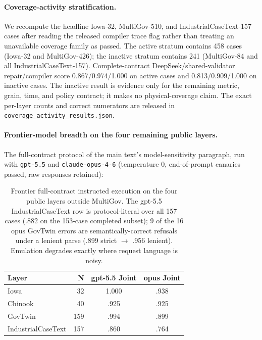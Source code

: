 \documentclass[letterpaper]{article}
\begin{document}
\paragraph{Coverage-activity stratification.}
We recompute the headline Iowa-32, MultiGov-510, and IndustrialCaseText-157 cases after reading the released compiler trace flag rather than treating an unavailable coverage family as passed. The active stratum contains 458 cases (Iowa-32 and MultiGov-426); the inactive stratum contains 241 (MultiGov-84 and all IndustrialCaseText-157). Complete-contract DeepSeek/shared-validator repair/compiler score 0.867/0.974/1.000 on active cases and 0.813/0.909/1.000 on inactive cases. The inactive result is evidence only for the remaining metric, grain, time, and policy contract; it makes no physical-coverage claim. The exact per-layer counts and correct numerators are released in \texttt{coverage\_activity\_results.json}.

\paragraph{Frontier-model breadth on the four remaining public layers.}
The full-contract protocol of the main text's model-sensitivity paragraph, run with \texttt{gpt-5.5} and \texttt{claude-opus-4-6} (temperature 0, end-of-prompt canaries passed, raw responses retained):

\begin{table}[t]
\centering
\scriptsize
\begin{tabular}{lrcc}
\toprule
Layer & N & gpt-5.5 Joint & opus Joint \\
\midrule
Iowa & 32 & 1.000 & .938 \\
Chinook & 40 & .925 & .925 \\
GovTwin & 159 & .994 & .899 \\
IndustrialCaseText & 157 & .860 & .764 \\
\bottomrule
\end{tabular}
\caption{Frontier full-contract instructed execution on the four public layers outside MultiGov. The gpt-5.5 IndustrialCaseText row is protocol-literal over all 157 cases (.882 on the 153-case completed subset); 9 of the 16 opus GovTwin errors are semantically-correct refusals under a lenient parse (.899 strict $\to$ .956 lenient). Emulation degrades exactly where request language is noisy.}
\end{table}
\end{document}
